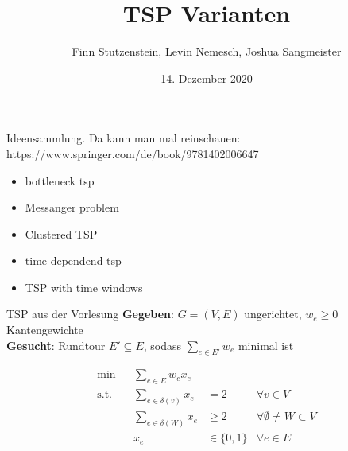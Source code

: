 \documentclass[ngerman,aspectratio=169,10pt]{beamer}
\title{TSP Varianten}
\date{14. Dezember 2020}
\author{Finn Stutzenstein, Levin Nemesch, Joshua Sangmeister}
\institute{Algorithm Engineering - Übung 3}
\begin{document}
\maketitle

\begin{frame}
	Ideensammlung. Da kann man mal reinschauen: https://www.springer.com/de/book/9781402006647
	\begin{itemize}
		\item bottleneck tsp
		\item Messanger problem
		\item Clustered TSP
		\item time dependend tsp
		\item TSP with time windows
	\end{itemize}
\end{frame}

\begin{frame}{TSP aus der Vorlesung}
	\textbf{Gegeben}: $G=(V,E)$ ungerichtet, $w_e\geq0$ Kantengewichte\\
	\textbf{Gesucht}: Rundtour $E'\subseteq E$, sodass $\sum_{e\in E'}w_e$ minimal ist
	
	\begin{align*}
	\min && \sum_{e\in E}w_ex_e&&\\
	\text{s.t.} && \sum_{e\in \delta(v)}x_e &=2 &\forall v\in V\\
	&& \sum_{e\in \delta(W)}x_e &\geq2 &\forall \emptyset\neq W\subset V\\
	&& x_e &\in\{0,1\} &\forall e\in E
	\end{align*}
\end{frame}
\end{document}
